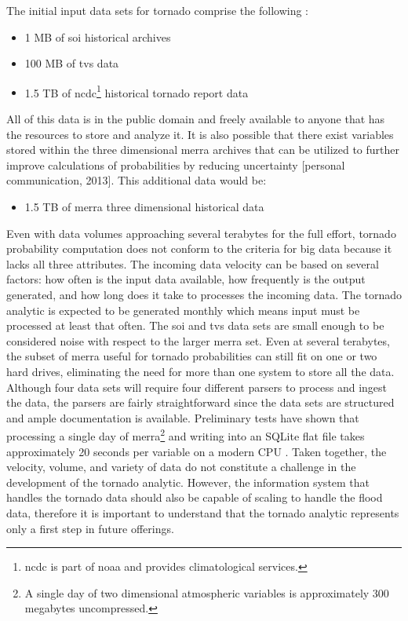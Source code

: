 The initial input data sets for tornado comprise the following \cite{walker}:
\begin{itemize}
    \item 1 MB of \gls{soi} historical archives \cite{bom}
    \item 100 MB of \gls{tvs} data \cite{hdss}
    \item 1.5 TB of \gls{ncdc}\footnote{\gls{ncdc} is part of \gls{noaa} and provides climatological services.} historical tornado report data \cite{ncdc}
\end{itemize}
All of this data is in the public domain and freely available to anyone that has the resources to store and analyze it. It is also possible that there exist variables stored within the three dimensional \gls{merra} archives that can be utilized to further improve calculations of probabilities by reducing uncertainty [personal communication, 2013]. This additional data would be:
\begin{itemize}
    \item 1.5 TB of \gls{merra} three dimensional historical data \cite{mdisc}
\end{itemize}
Even with data volumes approaching several terabytes for the full effort, tornado probability computation does not conform to the criteria for big data because it lacks all three attributes. The incoming data velocity can be based on several factors: how often is the input data available, how frequently is the output generated, and how long does it take to processes the incoming data. The tornado analytic is expected to be generated monthly which means input must be processed at least that often. The \gls{soi} and \gls{tvs} data sets are small enough to be considered noise with respect to the larger \gls{merra} set. Even at several terabytes, the subset of \gls{merra} useful for tornado probabilities can still fit on one or two hard drives, eliminating the need for more than one system to store all the data.  Although four data sets will require four different parsers to process and ingest the data, the parsers are fairly straightforward since the data sets are structured and ample documentation is available. Preliminary tests have shown that processing a single day of \gls{merra}\footnote{A single day of two dimensional atmospheric variables is approximately 300 megabytes uncompressed.} and writing into an SQLite flat file takes approximately 20 seconds per variable on a modern CPU \cite{keller1}. Taken together, the velocity, volume, and variety of data do not constitute a challenge in the development of the tornado analytic. However, the information system that handles the tornado data should also be capable of scaling to handle the flood data, therefore it is important to understand that the tornado analytic represents only a first step in future offerings.\\

